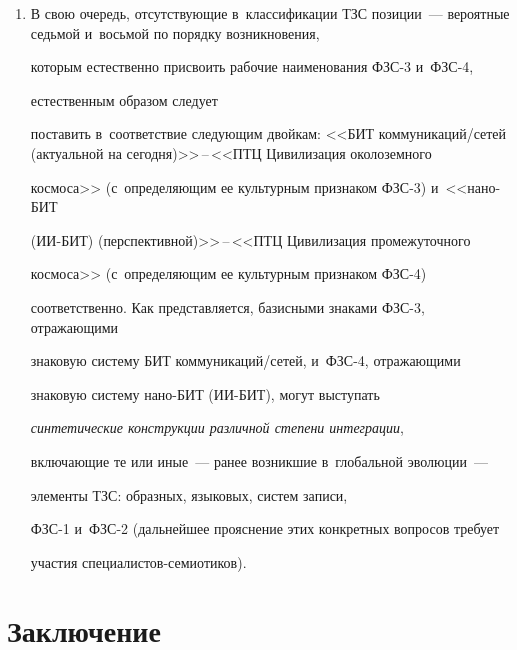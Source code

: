 \begin{enumerate}[1.]
  \item В свою очередь, отсутствующие в~классификации ТЗС позиции~--- вероятные седьмой и~восьмой по порядку возникновения, 


которым естественно присвоить рабочие наименования ФЗС-3 и~ФЗС-4, 


естественным образом следует 


поставить в~соответствие следующим двойкам: <<БИТ ком\-му\-ни\-ка\-ций\!/\!се\-тей (актуальной на сегодня)>>\,--\,<<ПТЦ Цивилизация околоземного 


космоса>> (с~определяющим ее культурным признаком ФЗС-3) и~<<нано-БИТ 


(ИИ-БИТ) (перс\-пек\-тив\-ной)>>\,--\,<<ПТЦ Цивилизация промежуточного 


космоса>> (с~определяющим ее культурным признаком ФЗС-4) 


соответственно. Как представляется, базисными знаками ФЗС-3, отражающими 


знаковую сис\-те\-му БИТ ком\-му\-ни\-ка\-ций\!/\!се\-тей, и~ФЗС-4, отражающими 


знаковую сис\-те\-му на\-но-БИТ (ИИ-БИТ), могут выступать 


\textit{синтетические конструкции различной степени интеграции}, 


включающие те или иные~--- ранее возникшие в~глобальной эволюции~--- 


элементы ТЗС: образных, языковых, сис\-тем записи,  


ФЗС-1 и~ФЗС-2 (дальнейшее прояснение этих конкретных вопросов требует 


участия специалистов-семиотиков).


  \end{enumerate}








\vspace*{-6pt}





\section{Заключение}





\vspace*{-3pt}





